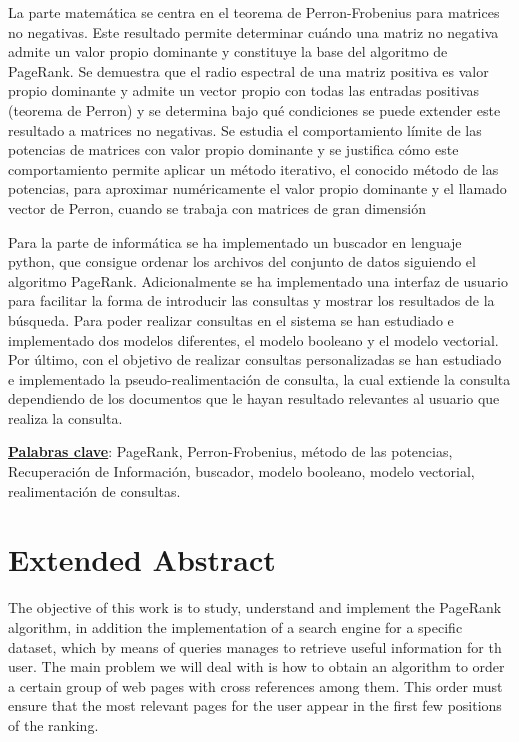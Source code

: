 \documentclass[size=a4, parskip=half, titlepage=false, toc=flat, toc=bib, 12pt, twoside]{scrartcl}
\theoremstyle{theorem-style}
\theoremstyle{definition-style}
\theoremstyle{remark-style}
\theoremstyle{example-style}
\theoremstyle{definition-style}
\theoremstyle{remark-style}
\begin{document}
La parte matemática se centra en el teorema de Perron-Frobenius para matrices no negativas. Este resultado permite determinar cuándo una matriz no negativa admite un valor propio dominante y constituye la base del algoritmo de PageRank. Se demuestra que el radio espectral de una matriz positiva es valor propio dominante y admite un vector propio con todas las entradas positivas (teorema de Perron) y se determina bajo qué condiciones se puede extender este resultado a matrices no negativas. Se estudia el comportamiento límite de las potencias de matrices con valor propio dominante y se justifica cómo este comportamiento permite aplicar un método iterativo, el conocido método de las potencias, para aproximar numéricamente el valor propio dominante y el llamado vector de Perron, cuando se trabaja con matrices de gran dimensión

Para la parte de informática se ha implementado un buscador en lenguaje python, que consigue ordenar los archivos del conjunto de datos siguiendo el algoritmo PageRank. Adicionalmente se ha implementado una interfaz de usuario para facilitar la forma de introducir las consultas y mostrar los resultados de la búsqueda. Para poder realizar consultas en el sistema se han estudiado e implementado dos modelos diferentes, el modelo booleano y el modelo vectorial. Por último, con el objetivo de realizar consultas personalizadas se han estudiado e implementado la pseudo-realimentación de consulta, la cual extiende la consulta dependiendo de los documentos que le hayan resultado relevantes al usuario que realiza la consulta.

\textbf{\underline{Palabras clave}}: PageRank, Perron-Frobenius, método de las potencias, Recuperación de Información, buscador, modelo booleano, modelo vectorial, realimentación de consultas.

\newpage

\section{Extended Abstract}
The objective of this work is to study, understand and implement the PageRank algorithm, in addition the implementation of a search engine for a specific dataset, which by means of queries manages to retrieve useful information for th user. The main problem we will deal with is how to obtain an algorithm to order a certain group of web pages with cross references among them. This order must ensure that the most relevant pages for the user appear in the first few positions of the ranking.
\end{document}
